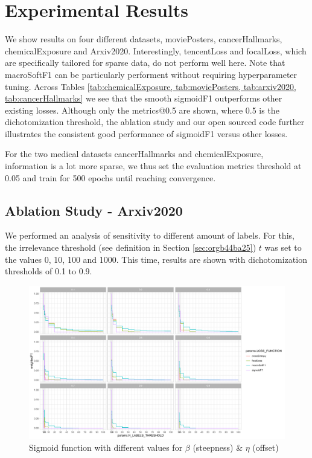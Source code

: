 
\section{Experimental Results}
\label{sec:orgc23a664}

We show results on four different datasets, moviePosters, cancerHallmarks, chemicalExposure and Arxiv2020.
Interestingly, tencentLoss and focalLoss, which are specifically tailored for sparse data, do not perform well here. Note that macroSoftF1 can be particularly performent without requiring hyperparameter tuning. Across Tables \ref{tab:chemicalExposure, tab:moviePosters, tab:arxiv2020, tab:cancerHallmarks} we see that the smooth sigmoidF1 outperforms other existing losses. Although only the metrics@0.5 are shown, where 0.5 is the dichotomization threshold, the ablation study and our open sourced code further illustrates the consistent good performance of sigmoidF1 versus other losses.


For the two medical datasets cancerHallmarks and chemicalExposure, information is a lot more sparse, we thus set the evaluation metrics threshold at 0.05 and train for 500 epochs until reaching convergence. 

\subsection{Ablation Study - Arxiv2020}

We performed an analysis of sensitivity to different amount of labels. For this, the irrelevance threshold (see definition in Section \ref{sec:orgb44ba25}) $t$ was set to the values 0, 10, 100 and 1000. This time, results are shown with dichotomization thresholds of 0.1 to 0.9. 


\begin{figure}[htbp]
\centering
\includegraphics[width=.9\linewidth]{./images/ablation.pdf}
\caption{\label{fig:ablation}
Sigmoid function with different values for $\beta$ (steepness) \& $\eta$ (offset)}
\end{figure}


